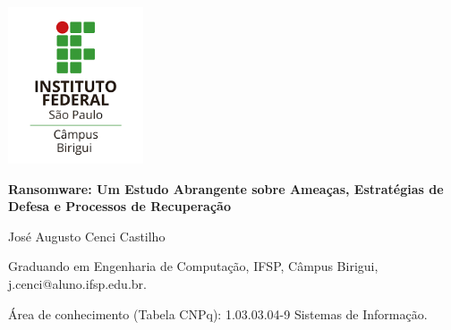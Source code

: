 \begin{flushright}
  \includegraphics[width=4cm]{imagens/logo_ifsp_bri.png}
\end{flushright}




\begin{center}

\vspace{0.5cm}
 \begin{center}
 \textbf{Ransomware: Um Estudo Abrangente sobre Ameaças, Estratégias de Defesa e Processos de Recuperação}
 \end{center}

\vspace{0.5cm}
José Augusto Cenci Castilho

\begingroup
  \fontsize{9pt}{11pt}\selectfont
  
  Graduando em Engenharia de Computação, IFSP, Câmpus Birigui, j.cenci@aluno.ifsp.edu.br.

Área de conhecimento (Tabela CNPq): 1.03.03.04-9 Sistemas de Informação. 
\endgroup

\end{center}
